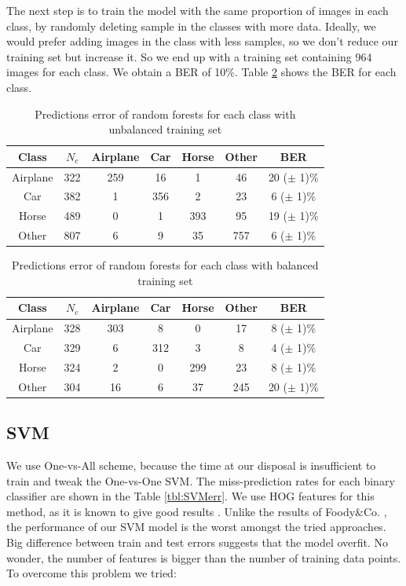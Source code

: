 \documentclass{article} %
\begin{document}
The next step is to train the model with the same proportion of images in each class, by randomly deleting sample in the classes with more data. Ideally, we would prefer adding images in the class with less samples, so we don't reduce our training set but increase it.
So we end up with a training set containing 964 images for each class. 
We obtain a BER of 10\%. Table \ref{tbl:errClassBal} shows the BER for each class.

\begin{table}[!htb]
	\centering
		\begin{tabular}{|c|c|c|c|c|c|c|}
			\hline Class & $N_{c}$ & Airplane & Car & Horse & Other & BER \\ 
			\hline Airplane    & 322 & 259 & 16 & 1 & 46 & 20 ($\pm$ 1)\% \\ 
			\hline Car 			 & 382 & 1 & 356 & 2 & 23 & 6 ($\pm$ 1)\% \\ 
			\hline Horse       & 489 & 0 & 1 & 393 & 95 & 19 ($\pm$ 1)\% \\ 
			\hline Other       & 807 & 6 & 9 & 35 & 757 & 6 ($\pm$ 1)\% \\ 
			\hline 
		\end{tabular} 
		\caption{Predictions error of random forests for each class with unbalanced training set}
		\label{tbl:errClassNotBal}
\end{table}

\begin{table}
	\centering
	\begin{tabular}{|c|c|c|c|c|c|c|}
		\hline Class 		 & $N_{c}$ & Airplane & Car & Horse & Other & BER \\ 
		\hline Airplane 	& 328 & 303 & 8 & 0 & 17 & 8 ($\pm$ 1)\% \\ 
		\hline Car 			  & 329 & 6 & 312 & 3 & 8 & 4 ($\pm$ 1)\% \\ 
		\hline Horse		& 324 & 2 & 0 & 299 & 23 & 8 ($\pm$ 1)\% \\ 
		\hline Other 	    & 304 & 16 & 6 & 37 & 245 & 20 ($\pm$ 1)\% \\ 
		\hline 
	\end{tabular} 
	\caption{Predictions error of random forests for each class with balanced training set}
	\label{tbl:errClassBal}
\end{table}


\subsection{SVM}

We use One-vs-All scheme, because the time at our disposal is insufficient to train and tweak the One-vs-One SVM. The miss-prediction rates for each binary classifier are shown in the Table \ref{tbl:SVMerr}. We use HOG features for this method, as it is known to give good results \cite{zhang2010pedestrian}. Unlike the results of Foody\&Co. \cite{foody2004relative}, the performance of our SVM model is the worst amongst the tried approaches. Big difference between train and test errors suggests that the model overfit. No wonder, the number of features is bigger than the number of training data points. To overcome this problem we tried:
\end{document}
